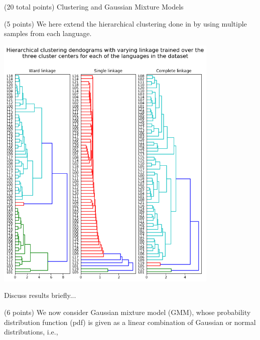 \documentclass[12pt]{article}
\begin{document}
\begin{question}{(20 total points) Clustering and Gaussian Mixture Models}
\begin{subquestion}{(5 points)
       We here extend the hierarchical clustering done in  by
       using multiple samples from each language.
     }
      \begin{answerbox}{52em}
        \begin{center}
        \includegraphics[width=0.8\textwidth]{images/q34.png}
        \end{center}
        Discuss results briefly...
      \end{answerbox}
  


   \end{subquestion}
   \begin{subquestion}{(6 points)
       We now consider Gaussian mixture model (GMM), whose
       probability distribution function (pdf) is given as
       a linear combination of Gaussian or normal distributions, i.e.,
     } \label{Q3.5}





\end{subquestion}
\end{question}
\end{document}
